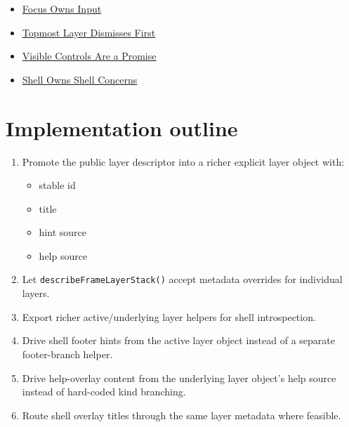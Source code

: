 \begin{itemize}
\tightlist
\item
  \href{https://github.com/flyingrobots/bijou/blob/cbd70612140e7a450d764b3c7be1c6af878b99bc/docs/invariants/focus-owns-input.md}{Focus Owns Input}
\item
  \href{https://github.com/flyingrobots/bijou/blob/cbd70612140e7a450d764b3c7be1c6af878b99bc/docs/invariants/topmost-layer-dismisses-first.md}{Topmost Layer Dismisses First}
\item
  \href{https://github.com/flyingrobots/bijou/blob/cbd70612140e7a450d764b3c7be1c6af878b99bc/docs/invariants/visible-controls-are-a-promise.md}{Visible Controls Are a Promise}
\item
  \href{https://github.com/flyingrobots/bijou/blob/cbd70612140e7a450d764b3c7be1c6af878b99bc/docs/invariants/shell-owns-shell-concerns.md}{Shell Owns Shell Concerns}
\end{itemize}

\section{Implementation outline}\label{record-256-implementation-outline}

\begin{enumerate}
\def\labelenumi{\arabic{enumi}.}
\tightlist
\item
  Promote the public layer descriptor into a richer explicit layer object with:

  \begin{itemize}
  \tightlist
  \item
    stable id
  \item
    title
  \item
    hint source
  \item
    help source
  \end{itemize}
\item
  Let \texttt{d\allowbreak{}e\allowbreak{}s\allowbreak{}c\allowbreak{}r\allowbreak{}i\allowbreak{}b\allowbreak{}e\allowbreak{}F\allowbreak{}r\allowbreak{}a\allowbreak{}m\allowbreak{}e\allowbreak{}L\allowbreak{}a\allowbreak{}y\allowbreak{}e\allowbreak{}r\allowbreak{}S\allowbreak{}t\allowbreak{}a\allowbreak{}c\allowbreak{}k\allowbreak{}(\allowbreak{})} accept metadata overrides for individual layers.
\item
  Export richer active/underlying layer helpers for shell introspection.
\item
  Drive shell footer hints from the active layer object instead of a separate footer-branch helper.
\item
  Drive help-overlay content from the underlying layer object's help source instead of hard-coded kind branching.
\item
  Route shell overlay titles through the same layer metadata where feasible.
\end{enumerate}

